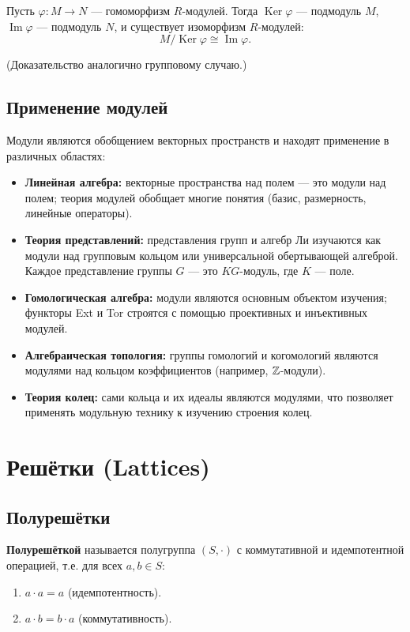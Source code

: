\documentclass[10pt]{article}
\begin{document}
\begin{theorem}
Пусть $\varphi: M \to N$ — гомоморфизм $R$-модулей. Тогда $\operatorname{Ker}\varphi$ — подмодуль $M$, $\operatorname{Im}\varphi$ — подмодуль $N$, и существует изоморфизм $R$-модулей:
$$M / \operatorname{Ker}\varphi \cong \operatorname{Im}\varphi.$$
\end{theorem}
(Доказательство аналогично групповому случаю.)

\subsection*{Применение модулей}
Модули являются обобщением векторных пространств и находят применение в различных областях:
\begin{itemize}
    \item \textbf{Линейная алгебра:} векторные пространства над полем — это модули над полем; теория модулей обобщает многие понятия (базис, размерность, линейные операторы).
    \item \textbf{Теория представлений:} представления групп и алгебр Ли изучаются как модули над групповым кольцом или универсальной обертывающей алгеброй. Каждое представление группы $G$ — это $KG$-модуль, где $K$ — поле.
    \item \textbf{Гомологическая алгебра:} модули являются основным объектом изучения; функторы Ext и Tor строятся с помощью проективных и инъективных модулей.
    \item \textbf{Алгебраическая топология:} группы гомологий и когомологий являются модулями над кольцом коэффициентов (например, $\mathbb{Z}$-модули).
    \item \textbf{Теория колец:} сами кольца и их идеалы являются модулями, что позволяет применять модульную технику к изучению строения колец.
\end{itemize}

\section{Решётки (Lattices)}

\subsection{Полурешётки}
\begin{definition}
\textbf{Полурешёткой} называется полугруппа $(S, \cdot)$ с коммутативной и идемпотентной операцией, т.е. для всех $a,b \in S$:
\begin{enumerate}
    \item $a \cdot a = a$ (идемпотентность).
    \item $a \cdot b = b \cdot a$ (коммутативность).
\end{enumerate}
\end{definition}
\end{document}
